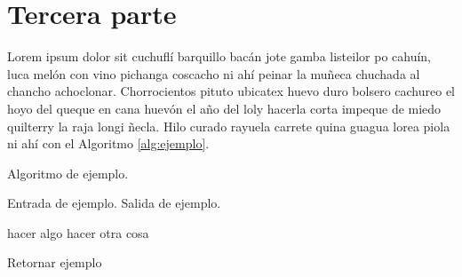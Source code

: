 \section{Tercera parte}
\label{sec:tercera}

Lorem ipsum dolor sit cuchuflí barquillo bacán jote gamba listeilor po cahuín, luca melón con vino pichanga coscacho ni ahí peinar la muñeca chuchada al chancho achoclonar. Chorrocientos pituto ubicatex huevo duro bolsero cachureo el hoyo del queque en cana huevón el año del loly hacerla corta impeque de miedo quilterry la raja longi ñecla. Hilo curado rayuela carrete quina guagua lorea piola ni ahí con el Algoritmo \ref{alg:ejemplo}.

\begin{algorithm}[!ht]
	\caption{Algoritmo de ejemplo.}
	\label{alg:ejemplo}
	\begin{algorithmic}[1]
	\REQUIRE Entrada de ejemplo.
	\ENSURE Salida de ejemplo.	
	
		\STATE hacer algo
	\ELSE
		\STATE hacer otra cosa
	\ENDIF
	
	\RETURN Retornar ejemplo
	
	\end{algorithmic}
\end{algorithm}